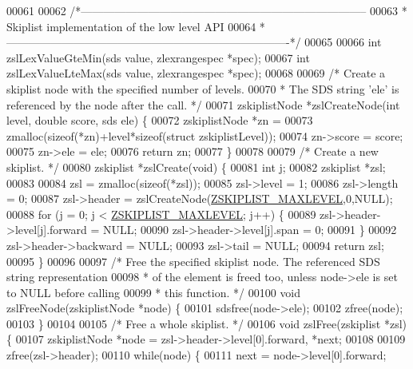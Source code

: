 \begin{DoxyCode}
00061 
00062 \textcolor{comment}{/*-----------------------------------------------------------------------------}
00063 \textcolor{comment}{ * Skiplist implementation of the low level API}
00064 \textcolor{comment}{ *----------------------------------------------------------------------------*/}
00065 
00066 \textcolor{keywordtype}{int} zslLexValueGteMin(sds value, zlexrangespec *spec);
00067 \textcolor{keywordtype}{int} zslLexValueLteMax(sds value, zlexrangespec *spec);
00068 
00069 \textcolor{comment}{/* Create a skiplist node with the specified number of levels.}
00070 \textcolor{comment}{ * The SDS string 'ele' is referenced by the node after the call. */}
00071 zskiplistNode *zslCreateNode(\textcolor{keywordtype}{int} level, \textcolor{keywordtype}{double} score, sds ele) \{
00072     zskiplistNode *zn =
00073         zmalloc(\textcolor{keyword}{sizeof}(*zn)+level*\textcolor{keyword}{sizeof}(\textcolor{keyword}{struct} zskiplistLevel));
00074     zn->score = score;
00075     zn->ele = ele;
00076     \textcolor{keywordflow}{return} zn;
00077 \}
00078 
00079 \textcolor{comment}{/* Create a new skiplist. */}
00080 zskiplist *zslCreate(\textcolor{keywordtype}{void}) \{
00081     \textcolor{keywordtype}{int} j;
00082     zskiplist *zsl;
00083 
00084     zsl = zmalloc(\textcolor{keyword}{sizeof}(*zsl));
00085     zsl->level = 1;
00086     zsl->length = 0;
00087     zsl->header = zslCreateNode(\hyperlink{server_8h_a36822e3ce2740c64859068fd849e227b}{ZSKIPLIST\_MAXLEVEL},0,NULL);
00088     \textcolor{keywordflow}{for} (j = 0; j < \hyperlink{server_8h_a36822e3ce2740c64859068fd849e227b}{ZSKIPLIST\_MAXLEVEL}; j++) \{
00089         zsl->header->level[j].forward = NULL;
00090         zsl->header->level[j].span = 0;
00091     \}
00092     zsl->header->backward = NULL;
00093     zsl->tail = NULL;
00094     \textcolor{keywordflow}{return} zsl;
00095 \}
00096 
00097 \textcolor{comment}{/* Free the specified skiplist node. The referenced SDS string representation}
00098 \textcolor{comment}{ * of the element is freed too, unless node->ele is set to NULL before calling}
00099 \textcolor{comment}{ * this function. */}
00100 \textcolor{keywordtype}{void} zslFreeNode(zskiplistNode *node) \{
00101     sdsfree(node->ele);
00102     zfree(node);
00103 \}
00104 
00105 \textcolor{comment}{/* Free a whole skiplist. */}
00106 \textcolor{keywordtype}{void} zslFree(zskiplist *zsl) \{
00107     zskiplistNode *node = zsl->header->level[0].forward, *next;
00108 
00109     zfree(zsl->header);
00110     \textcolor{keywordflow}{while}(node) \{
00111         next = node->level[0].forward;

\end{DoxyCode}
